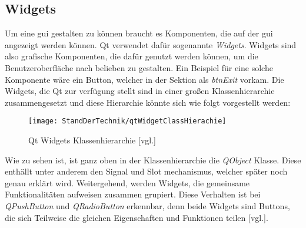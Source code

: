 \subsection{Widgets}
\label{subsec:widgets}
Um eine \ac{gui} gestalten zu können braucht es Komponenten, die auf der \ac{gui} angezeigt
werden können. Qt verwendet dafür sogenannte \emph{Widgets}. Widgets sind also grafische
Komponenten, die dafür genutzt werden können, um die Benutzeroberfläche nach belieben zu
gestalten. Ein Beispiel für eine solche Komponente wäre ein Button, welcher in der Sektion
\emph{} als \emph{btnExit} vorkam.
\newline
\newline
Die Widgets, die Qt zur verfügung stellt sind in einer großen Klassenhierarchie zusammengesetzt
und diese Hierarchie könnte sich wie folgt vorgestellt werden:

\begin{figure}[h]
    \centering
    \texttt{[image: StandDerTechnik/qtWidgetClassHierachie]}
    \caption[Qt Widgets Klassenhierachie]{Qt Widgets Klassenhierarchie
    \cite{GettingStartedQt}[vgl.]}
    \label{img:qtWidgetClassHierachie}
\end{figure}

Wie zu sehen ist, ist ganz oben in der Klassenhierarchie die \emph{QObject} Klasse. Diese
enthällt unter anderem den Signal und Slot mechanismus, welcher später noch genau erklärt wird.
Weitergehend, werden Widgets, die gemeinsame Funktionalitäten aufweisen zusammen grupiert. Diese
Verhalten ist bei \emph{QPushButton} und \emph{QRadioButton} erkennbar, denn beide Widgets sind
Buttons, die sich Teilweise die gleichen Eigenschaften und Funktionen teilen
\cite{GettingStartedQt}[vgl.].
